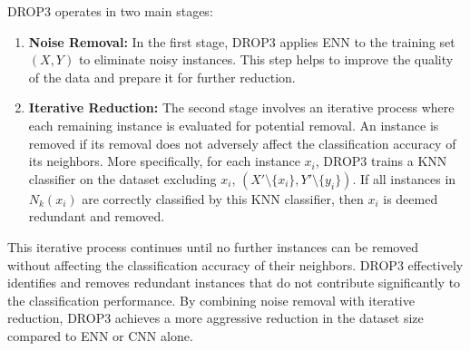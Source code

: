 DROP3 operates in two main stages:

\begin{enumerate}
    \item \textbf{Noise Removal:} In the first stage, DROP3 applies ENN to the training set $(X, Y)$ to eliminate noisy instances. This step helps to improve the quality of the data and prepare it for further reduction. 
    \item \textbf{Iterative Reduction:} The second stage involves an iterative process where each remaining instance is evaluated for potential removal. An instance is removed if its removal does not adversely affect the classification accuracy of its neighbors.  More specifically, for each instance $x_i$, DROP3 trains a KNN classifier on the dataset excluding $x_i$, $(X' \setminus \{x_i\}, Y' \setminus \{y_i\})$. If all instances in $N_k(x_i)$ are correctly classified by this KNN classifier, then $x_i$ is deemed redundant and removed.
\end{enumerate}

This iterative process continues until no further instances can be removed without affecting the classification accuracy of their neighbors. DROP3 effectively identifies and removes redundant instances that do not contribute significantly to the classification performance. By combining noise removal with iterative reduction, DROP3 achieves a more aggressive reduction in the dataset size compared to ENN or CNN alone.

